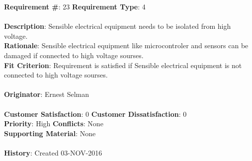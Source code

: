 \documentclass[titlepage]{article}
\begin{document}
\begin{framed}
	\noindent\textbf{Requirement \#}: 23 \hfill \textbf{Requirement Type}: 4 \hfill\\\\
	\noindent\textbf{Description}: Sensible electrical equipment needs to be isolated from high voltage.\\
	\textbf{Rationale}: Sensible electrical equipment like microcontroler and sensors can be damaged if connected to high voltage sourses.\\
	\textbf{Fit Criterion}: Requirement is satisfied if Sensible electrical equipment is not connected to high voltage sourses. \\\\
	\textbf{Originator}: Ernest Selman\\\\
	\noindent\textbf{Customer Satisfaction}: 0 \hfill 	\textbf{Customer Dissatisfaction}: 0 \hfill\\
	\textbf{Priority}: High \hfill \textbf{Conflicts}: None \hfill\\
	\textbf{Supporting Material}: None\\\\
	\noindent\textbf{History}: Created 03-NOV-2016
\end{framed}
\end{document}
